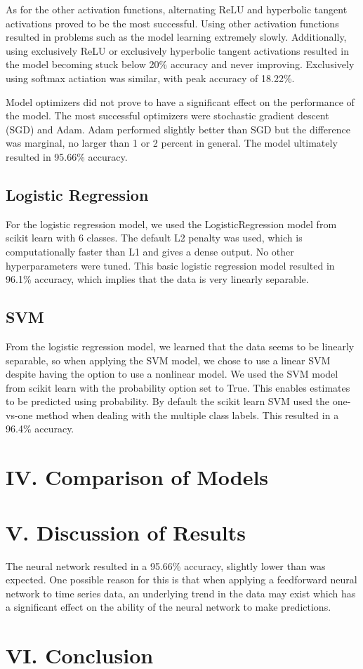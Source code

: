 \documentclass[12pt]{article}
\begin{document}
As for the other activation functions, alternating ReLU and hyperbolic tangent activations proved to be the most successful. Using other activation functions resulted in problems such as the model learning extremely slowly. Additionally, using exclusively ReLU or exclusively hyperbolic tangent activations resulted in the model becoming stuck below 20\% accuracy and never improving. Exclusively using softmax actiation was similar, with peak accuracy of 18.22\%.

Model optimizers did not prove to have a significant effect on the performance of the model. The most successful optimizers were stochastic gradient descent (SGD) and Adam. Adam performed slightly better than SGD but the difference was marginal, no larger than 1 or 2 percent in general. The model ultimately resulted in 95.66\% accuracy. 

\subsection*{Logistic Regression}
For the logistic regression model, we used the LogisticRegression model from scikit learn with 6 classes. The default L2 penalty was used, which is computationally faster than L1 and gives a dense output. No other hyperparameters were tuned. This basic logistic regression model resulted in 96.1\% accuracy, which implies that the data is very linearly separable.

\subsection*{SVM}
From the logistic regression model, we learned that the data seems to be linearly separable, so when applying the SVM model, we chose to use a linear SVM despite having the option to use a nonlinear model. We used the SVM model from scikit learn with the probability option set to True. This enables estimates to be predicted using probability. By default the scikit learn SVM used the one-vs-one method when dealing with the multiple class labels. This resulted in a 96.4\% accuracy.
\section*{IV. Comparison of Models}
\section*{V. Discussion of Results}
The neural network resulted in a 95.66\% accuracy, slightly lower than was expected. One possible reason for this is that when applying a feedforward neural network to time series data, an underlying trend in the data may exist which has a significant effect on the ability of the neural network to make predictions.

\section*{VI. Conclusion}
\end{document}
